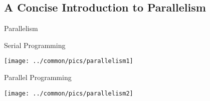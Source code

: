 \subsection{A Concise Introduction to Parallelism}
\makesubcontentsslidessec



\begin{frame}
  \begin{block}{Parallelism}\pause
    \begin{center}
    \begin{minipage}{.46\textwidth}
    \begin{block}{\centering Serial Programming}
      \begin{center}
      \texttt{[image: ../common/pics/parallelism1]}
      \end{center}
      \end{block}
    \end{minipage}
    \hspace{.15cm}
    \begin{minipage}{.46\textwidth}
    \begin{block}{\centering Parallel Programming}
      \begin{center}
      \texttt{[image: ../common/pics/parallelism2]}
      \end{center}
      \end{block}
    \end{minipage}
    \end{center}
  \end{block}
\end{frame}

